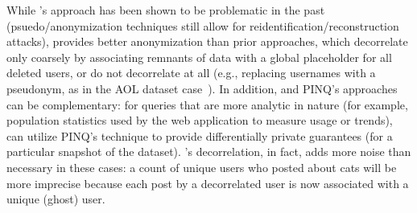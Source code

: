 While \sys{}'s approach has been shown to be problematic in the past (psuedo/anonymization
techniques still allow for reidentification/reconstruction attacks), \sys{} provides better
anonymization than prior approaches, which decorrelate only coarsely by associating remnants of data
with a global placeholder for all deleted users, or do not decorrelate at all (e.g., replacing
usernames with a pseudonym, as in the AOL dataset case~\cite{aol}). In addition, \sys{} and PINQ's
approaches can be complementary: for queries that are more analytic in nature (for example,
population statistics used by the web application to measure usage or trends), \sys{} can utilize
PINQ's technique to provide differentially private guarantees (for a particular snapshot of the
dataset).  \sys{}'s decorrelation, in fact, adds more noise than necessary in these cases: a count
of unique users who posted about cats will be more imprecise because each post by a decorrelated
user is now associated with a unique (ghost) user.

%
%
%
%
%

